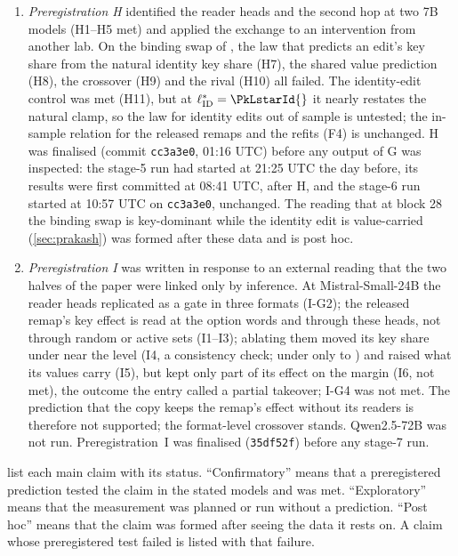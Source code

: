 \begin{enumerate}
  \item \emph{Preregistration H} identified the reader heads and the second hop at two 7B models (H1--H5 met) and applied the exchange to an intervention from another lab. On the binding swap of \citet{prakash2025lookbacks}, the law that predicts an edit's key share from the natural identity key share (H7), the shared value prediction (H8), the crossover (H9) and the rival (H10) all failed. The identity-edit control was met (H11), but at $\ell^*_{\mathrm{ID}} = \PkLstarId{}$ it nearly restates the natural clamp, so the law for identity edits out of sample is untested; the in-sample relation for the released remaps and the refits (F4) is unchanged. H was finalised (commit \texttt{cc3a3e0}, 01:16 UTC) before any output of G was inspected: the stage-5 run had started at 21:25 UTC the day before, its results were first committed at 08:41 UTC, after H, and the stage-6 run started at 10:57 UTC on \texttt{cc3a3e0}, unchanged. The reading that at block 28 the binding swap is key-dominant while the identity edit is value-carried (\cref{sec:prakash}) was formed after these data and is post hoc.
  \item \emph{Preregistration I} was written in response to an external reading that the two halves of the paper were linked only by inference. At Mistral-Small-24B the reader heads replicated as a gate in three formats (I-G2); the released remap's key effect is read at the option words and through these heads, not through random or active sets (I1--I3); ablating them moved its key share under \fmtOpt{} near the \fmtNone{} level (I4, a consistency check; under \fmtLetter{} only to \IfourKappaALetter{}) and raised what its values carry (I5), but kept only part of its effect on the margin (I6, not met), the outcome the entry called a partial takeover; I-G4 was not met. The prediction that the copy keeps the remap's effect without its readers is therefore not supported; the format-level crossover stands. Qwen2.5-72B was not run. Preregistration~I was finalised (\texttt{35df52f}) before any stage-7 run.
\end{enumerate}

 list each main claim with its status. ``Confirmatory'' means that a preregistered prediction tested the claim in the stated models and was met. ``Exploratory'' means that the measurement was planned or run without a prediction. ``Post hoc'' means that the claim was formed after seeing the data it rests on. A claim whose preregistered test failed is listed with that failure.

